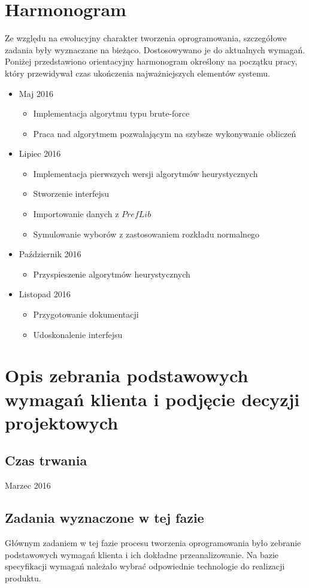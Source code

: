 \documentclass[pdflatex,11pt]{../aghdoc_version2}
\begin{document}
\section{Harmonogram}
Ze względu na ewolucyjny charakter tworzenia oprogramowania, szczegółowe zadania były wyznaczane na bieżąco. Dostosowywano je do aktualnych wymagań. Poniżej przedstawiono orientacyjny harmonogram określony na początku pracy, który
przewidywał czas ukończenia najważniejszych elementów systemu.
\begin{itemize}
\item Maj 2016
	\begin{itemize}
	\item Implementacja algorytmu typu brute-force
	\item Praca nad algorytmem pozwalającym na szybsze wykonywanie obliczeń
	\end{itemize}
\item Lipiec 2016
	\begin{itemize}
	\item Implementacja pierwszych wersji algorytmów heurystycznych
	\item Stworzenie interfejsu
	\item Importowanie danych z $PrefLib$
	\item Symulowanie wyborów z zastosowaniem rozkładu normalnego
	\end{itemize}
\item Październik 2016
	\begin{itemize}
	\item Przyspieszenie algorytmów heurystycznych
	\end{itemize}
\item Listopad 2016
	\begin{itemize}
	\item Przygotowanie dokumentacji
	\item Udoskonalenie interfejsu
	\end{itemize}
\end{itemize}

\section{Opis zebrania podstawowych wymagań klienta i podjęcie
decyzji projektowych}

\subsection{Czas trwania}
Marzec 2016
\subsection{Zadania wyznaczone w tej fazie}
Głównym zadaniem w tej fazie procesu tworzenia oprogramowania było zebranie
podstawowych wymagań klienta i ich dokładne przeanalizowanie. Na bazie specyfikacji
wymagań należało wybrać odpowiednie technologie do realizacji produktu.
\end{document}
